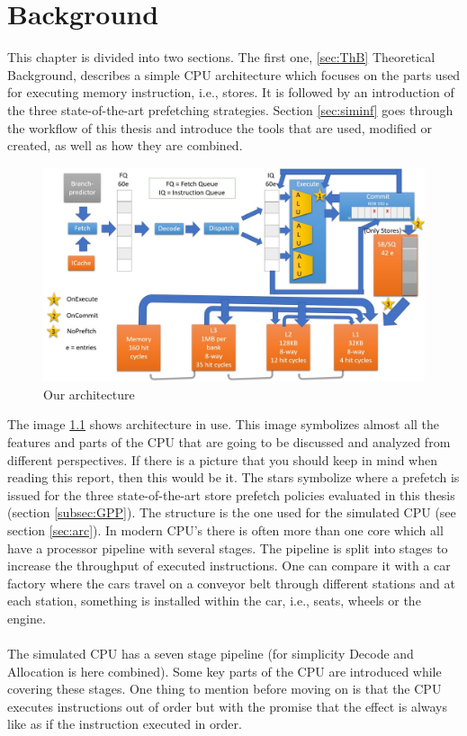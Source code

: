 \chapter{Background}
\label{chap:bg}
This chapter is divided into two sections. The first one, \ref{sec:ThB} Theoretical Background,
describes a simple CPU architecture which focuses on the parts used
for executing memory instruction, i.e., stores. It is followed by an introduction of
the three state-of-the-art prefetching strategies. Section \ref{sec:siminf}  goes through the
workflow of this thesis and introduce the tools that are used, modified or created, as
well as how they are combined.

\begin{figure}[h]
\centering
\includegraphics[width=12cm]{figure/thoeratical-arc.jpg}
\caption{Our architecture}
\label{img:arc}
\end{figure}
The image \ref{img:arc} shows architecture in use. This image symbolizes almost all
the features and parts of the CPU that are going to be discussed and analyzed from different
perspectives. If there is a picture that you should keep in mind when reading this
report, then this would be it. The stars symbolize where a prefetch is issued for the
three state-of-the-art store prefetch policies evaluated in this thesis (section \ref{subsec:GPP}). The structure is the one used for the
simulated CPU (see section \ref{sec:arc}). In modern CPU’s there is often more than one
core which all have a processor pipeline with several stages. The pipeline is split into
stages to increase the throughput of executed instructions. One can compare it with
a car factory where the cars travel on a conveyor belt through different stations and
at each station, something is installed within the car, i.e., seats, wheels or the engine.
\\ \\
The simulated CPU has a seven stage pipeline (for simplicity Decode and Allocation is here combined). Some key parts of the CPU are introduced while covering these stages. One thing to mention before moving
on is that the CPU executes instructions out of order but with the promise that the effect
is always like as if the instruction executed in order.
 \\ \\

